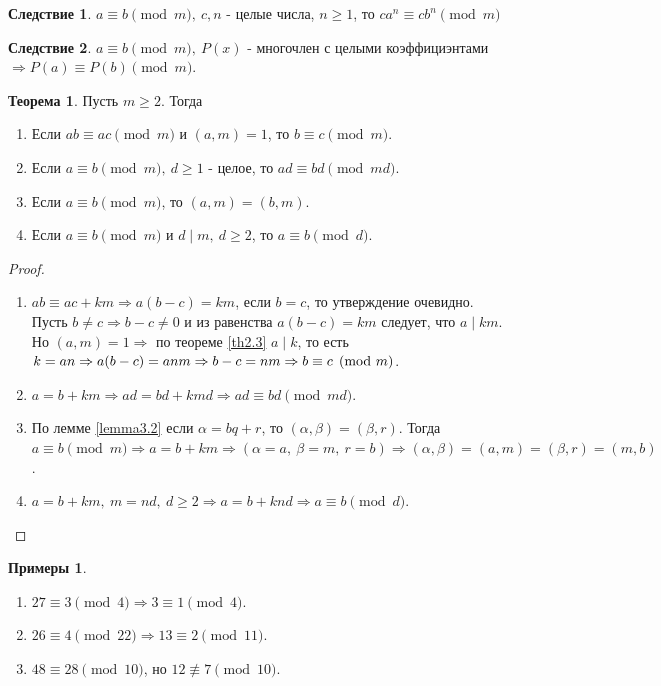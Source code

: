 \documentclass[a4paper, 12pt]{article}
\renewcommand{\div}{\mid}
\newcommand\tab[1][.5cm]{\hspace*{#1}}
\theoremstyle{definition}
\newtheorem{theorem}{Теорема}[section]
\newtheorem*{consequense}{Следствие}
\newtheorem*{examples}{Примеры}
\begin{document}
    \begin{consequense}
        $a\equiv b \pmod{m},\ c,n$ - целые числа, $n\geq 1$, то $ca^n\equiv cb^n \pmod{m}$
    \end{consequense} 
    \begin{consequense}
        $a\equiv b \pmod{m},\ P(x)$ - многочлен с целыми коэффициэнтами\\ $\Rightarrow P(a)\equiv P(b) \pmod{m}$.
    \end{consequense} 
    \begin{theorem}\label{th8.2}
        Пусть $m\geq 2$. Тогда 
        \begin{enumerate}
            \item Если $ab\equiv ac \pmod{m}$ и $(a,m)=1$, то $b\equiv c \pmod{m}$.
            \item Если $a\equiv b \pmod{m},\ d\geq 1$ - целое, то $ad\equiv bd \pmod{md}$.
            \item Если $a\equiv b \pmod{m}$, то $(a,m)=(b,m)$.
            \item Если $a\equiv b \pmod{m}$ и $d \div m,\ d\geq 2$, то $a\equiv b \pmod{d}$.
        \end{enumerate}
    \end{theorem} 
    \begin{proof}\tab
        \begin{enumerate}
            \item $ab\equiv ac+km \Rightarrow a(b-c)=km$, если $b=c$, то утверждение очевидно. Пусть $b\ne c \Rightarrow b-c\ne 0$ и из равенства $a(b-c)=km$ следует, что $a\div km$. Но $(a,m)=1 \Rightarrow$ по теореме \ref{th2.3} $a\div k$, то есть $k=an \Rightarrow a(b-c)=anm\\
            \Rightarrow b-c=nm \Rightarrow b\equiv c \pmod{m}$.
            \item $a=b+km \Rightarrow ad=bd+kmd \Rightarrow ad\equiv bd \pmod{md}$.
            \item По лемме \ref{lemma3.2} если $\alpha=bq+r$, то $(\alpha,\beta)=(\beta,r)$. Тогда $a\equiv b \pmod{m} \Rightarrow a=b+km \Rightarrow (\alpha=a,\ \beta=m,\ r=b) \Rightarrow (\alpha,\beta)=(a,m)=(\beta,r)=(m,b)$.
            \item $a=b+km,\ m=nd,\ d\geq 2 \Rightarrow a=b+knd \Rightarrow a\equiv b \pmod{d}$.
        \end{enumerate}
    \end{proof} 
    \begin{examples}\tab
        \begin{enumerate}
            \item $27 \equiv 3 \pmod{4} \Rightarrow 3\equiv 1 \pmod{4}$.
            \item $26\equiv 4 \pmod{22} \Rightarrow 13\equiv 2 \pmod{11}$.
            \item $48\equiv 28 \pmod{10}$, но $12 \not\equiv 7 \pmod{10}$.
        \end{enumerate}
    \end{examples}
\end{document}
